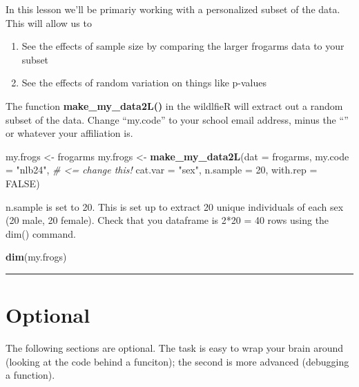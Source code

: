 \documentclass[]{book}
\newenvironment{Shaded}{\begin{snugshade}}{\end{snugshade}}
\newcommand{\KeywordTok}[1]{\textcolor[rgb]{0.13,0.29,0.53}{\textbf{#1}}}
\newcommand{\DataTypeTok}[1]{\textcolor[rgb]{0.13,0.29,0.53}{#1}}
\newcommand{\DecValTok}[1]{\textcolor[rgb]{0.00,0.00,0.81}{#1}}
\newcommand{\StringTok}[1]{\textcolor[rgb]{0.31,0.60,0.02}{#1}}
\newcommand{\CommentTok}[1]{\textcolor[rgb]{0.56,0.35,0.01}{\textit{#1}}}
\newcommand{\OtherTok}[1]{\textcolor[rgb]{0.56,0.35,0.01}{#1}}
\newcommand{\NormalTok}[1]{#1}
\providecommand{\tightlist}{%
  \setlength{\itemsep}{0pt}\setlength{\parskip}{0pt}}
\theoremstyle{definition}
\theoremstyle{definition}
\theoremstyle{definition}
\theoremstyle{remark}
\begin{document}
In this lesson we'll be primariy working with a personalized subset of
the data. This will allow us to

\begin{enumerate}
\def\labelenumi{\arabic{enumi}.}
\tightlist
\item
  See the effects of sample size by comparing the larger frogarms data
  to your subset
\item
  See the effects of random variation on things like p-values
\end{enumerate}

The function \textbf{make\_my\_data2L()} in the wildlfieR will extract
out a random subset of the data. Change ``my.code'' to your school email
address, minus the ``\citet{pitt.edu}'' or whatever your affiliation is.

\begin{Shaded}
\begin{Highlighting}[]
\NormalTok{my.frogs <-}\StringTok{ }\NormalTok{frogarms}
\NormalTok{my.frogs <-}\StringTok{ }\KeywordTok{make_my_data2L}\NormalTok{(}\DataTypeTok{dat =}\NormalTok{ frogarms,}
                           \DataTypeTok{my.code =} \StringTok{"nlb24"}\NormalTok{, }\CommentTok{# <=  change this!}
                           \DataTypeTok{cat.var =} \StringTok{"sex"}\NormalTok{,}
                           \DataTypeTok{n.sample =} \DecValTok{20}\NormalTok{,}
                           \DataTypeTok{with.rep =} \OtherTok{FALSE}\NormalTok{)}
\end{Highlighting}
\end{Shaded}

n.sample is set to 20. This is set up to extract 20 unique individuals
of each sex (20 male, 20 female). Check that you dataframe is 2*20 = 40
rows using the dim() command.

\begin{Shaded}
\begin{Highlighting}[]
\KeywordTok{dim}\NormalTok{(my.frogs)}
\end{Highlighting}
\end{Shaded}

\begin{center}\rule{0.5\linewidth}{\linethickness}\end{center}

\section{Optional}\label{optional}

The following sections are optional. The task is easy to wrap your brain
around (looking at the code behind a funciton); the second is more
advanced (debugging a function).
\end{document}
